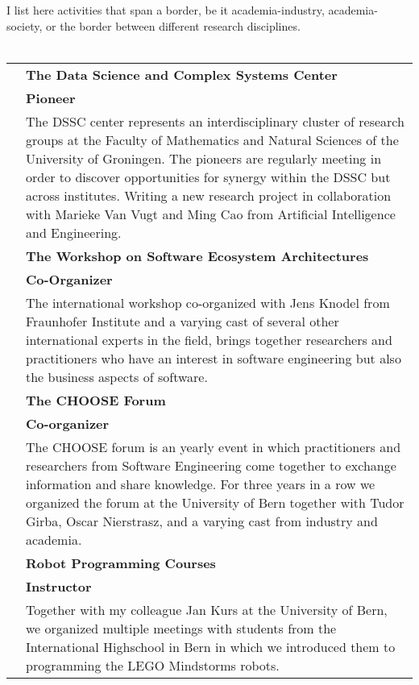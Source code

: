 


I list here activities that span a border, be it academia-industry, academia-society, or the border between different research disciplines.
\\ \\ 

\newcommand {\outreach}[4]{
	\makebox[2.5cm][r]{\small #1} &
	{\bf #2} \\ & 
	{\bf #3} \\ & 
	#4 \vspace{0.7em}\\
}


\begin{tabular}{rp{10.5cm}}

	\outreach 
		{2015 -- ...}
		{The Data Science and Complex Systems Center}{Pioneer}
			{The DSSC center represents an interdisciplinary cluster of research groups at the Faculty of Mathematics and Natural Sciences of the University of Groningen. The pioneers are regularly meeting in order to discover opportunities for synergy within the DSSC but across institutes. Writing a new research project in collaboration with Marieke Van Vugt and Ming Cao from Artificial Intelligence and Engineering.}

	\outreach 
		{2013 -- ... }
		{The Workshop on Software Ecosystem Architectures}{Co-Organizer}
			{The international workshop co-organized with Jens Knodel from Fraunhofer Institute and a varying cast of several other international experts in the field, brings together researchers and practitioners who have an interest in software engineering but also the business aspects of software. }


	\outreach 
		{2012 -- 2014}
			{The CHOOSE Forum}{Co-organizer}
			{The CHOOSE forum is an yearly event in which practitioners and researchers from Software Engineering come together to  exchange information and share knowledge. For three years in a row we organized the forum at the University of Bern together with Tudor Girba, Oscar Nierstrasz, and a varying cast from industry and academia.}

	\outreach
		{2013 -- 2014}
			{Robot Programming Courses}{Instructor}
			{Together with my colleague Jan Kurs at the University of Bern, we organized multiple meetings with students from the International Highschool in Bern in which we introduced them to programming the LEGO Mindstorms robots. }


\end{tabular}
